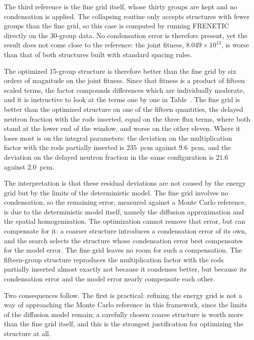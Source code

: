 The third reference is the fine grid itself, whose thirty groups are kept and
no condensation is applied. The collapsing routine only accepts structures with
fewer groups than the fine grid, so this case is computed by running FRENETIC
directly on the 30-group data. No condensation error is therefore present, yet
the result does not come close to the reference: the joint fitness,
$8.049\times10^{13}$, is worse than that of both structures built with
standard spacing rules.

The optimized 15-group structure is therefore better than the fine grid by six
orders of magnitude on the joint fitness. Since that fitness is a product of
fifteen scaled terms, the factor compounds differences which are individually
moderate, and it is instructive to look at the terms one by one in
Table~. The fine grid is better than the optimized
structure on one of the fifteen quantities, the delayed neutron fraction with
the rods inserted, equal on the three flux terms, where both stand at the lower
end of the window, and worse on the other eleven. Where it loses most is on the
integral parameters: the deviation on the multiplication factor with the rods
partially inserted is $235$~pcm against $9.6$~pcm, and the deviation on the
delayed neutron fraction in the same configuration is $21.6$ against
$2.0$~pcm.

The interpretation is that these residual deviations are not caused by the
energy grid but by the limits of the deterministic model. The fine grid
involves no condensation, so the remaining error, measured against a Monte
Carlo reference, is due to the deterministic model itself, namely the diffusion
approximation and the spatial homogenization. The optimization cannot remove that error, but can compensate
for it: a coarser structure introduces a condensation error of its own, and the
search selects the structure whose condensation error best compensates for the
model error. The fine grid leaves no room for such a compensation.
The fifteen-group structure reproduces the multiplication factor with the rods
partially inserted almost exactly not because it condenses better, but because
its condensation error and the model error nearly compensate each other.

Two consequences follow. The first is practical: refining the energy grid is not
a way of approaching the Monte Carlo reference in this framework, since the
limits of the diffusion model remain; a carefully chosen coarse structure is
worth more than the fine grid itself, and this is the strongest
justification for optimizing the structure at all.

